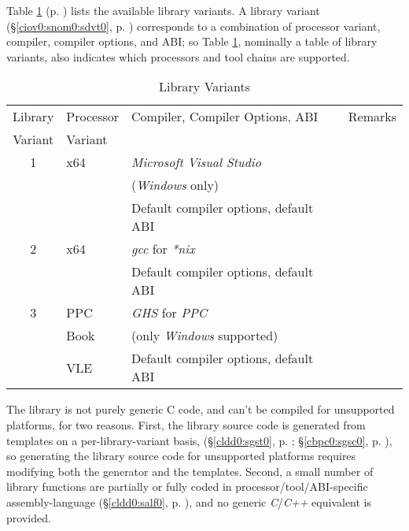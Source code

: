 Table \ref{tbl:cldd0:sscc0:01} (p.  
\pageref{tbl:cldd0:sscc0:01}) lists the available library 
variants.  A library variant (\S{}\ref{ciov0:snom0:sdvt0}, 
p.  \pageref{ciov0:snom0:sdvt0}) corresponds to a 
combination of processor variant, compiler, compiler 
options, and ABI; so Table \ref{tbl:cldd0:sscc0:01}, 
nominally a table of library variants, also indicates which 
processors and tool chains are supported.  

\begin{table}
\caption{\emph{\productbasenameshort{}} Library Variants}
\label{tbl:cldd0:sscc0:01}
\begin{center}
\begin{tabular}{|c|l|l|l|}
\hline
Library & Processor & Compiler, Compiler Options, ABI                         & Remarks                               \\
Variant & Variant   &                                                         &                                       \\
\hline
\hline
   1    & x64       & \emph{Microsoft Visual Studio}                          &                                       \\
        &           & (\index{Windows@\emph{Windows}}\emph{Windows} only)     &                                       \\
        &           & Default compiler options, default ABI                   &                                       \\
\hline
   2    & x64       & \emph{gcc} for \index{----nix@\emph{*nix}}\emph{*nix}   &                                       \\
        &           & Default compiler options, default ABI                   &                                       \\
\hline
   3    & PPC       & \emph{GHS} for \emph{PPC}                               &                                       \\
        & Book      & (only \emph{Windows} supported)                         &                                       \\
        & VLE       & Default compiler options, default ABI                   &                                       \\
\hline
\end{tabular}
\end{center}
\end{table}

The library is not purely generic C code, and can't be 
compiled for unsupported platforms, for two reasons.  First, 
the library source code is generated from templates on a 
per-library-variant basis, (\S{}\ref{cldd0:sgst0}, p.  
\pageref{cldd0:sgst0}; \S{}\ref{cbpc0:sgsc0}, p.  
\pageref{cbpc0:sgsc0}), so generating the library source 
code for unsupported platforms requires modifying both the 
generator and the templates.  Second, a small number of 
library functions are partially or fully coded in 
processor/\-tool/\-ABI-specific assembly-language 
(\S{}\ref{cldd0:salf0}, p.  \pageref{cldd0:salf0}), and no 
generic \emph{C}/\emph{C++} equivalent is provided.


